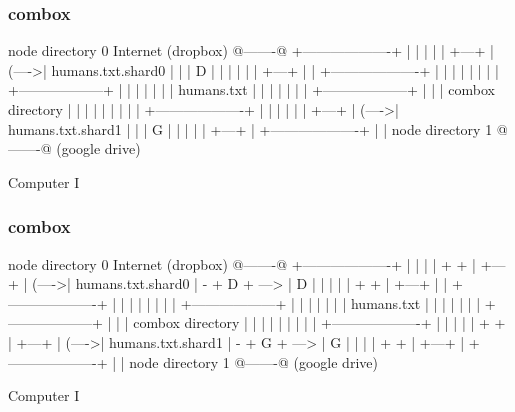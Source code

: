 \begin{frame}[fragile]
  \frametitle{combox}

  {\tiny
  \begin{semiverbatim}

         node directory 0                Internet
         (dropbox)                       @-------@
        +-------------------+            |       |
        |                   |            | +---+ |
  (---->| humans.txt.shard0 |            | | D | |
  |     |                   |            | +---+ |
  |     +-------------------+            |       |
  |                                      |       |
  |                                      |       |
 +------------------+                    |       |
 |                  |                    |       |
 |  humans.txt      |                    |       |
 |                  |                    |       |
 +------------------+                    |       |
  |  combox directory                    |       |
  |                                      |       |
  |                                      |       |
  |     +-------------------+            |       |
  |     |                   |            | +---+ |
  (---->| humans.txt.shard1 |            | | G | |
        |                   |            | +---+ |
        +-------------------+            |       |
         node directory 1                @-------@
         (google drive)

  Computer I
  \end{semiverbatim}
  }

\end{frame}

\begin{frame}[fragile]
  \frametitle{combox}

  {\tiny
  \begin{semiverbatim}

         node directory 0                Internet
         (dropbox)                       @-------@
        +-------------------+            |       |
        |                   |    + +     | +---+ |
  (---->| humans.txt.shard0 | - + D + ---> | D | |
  |     |                   |    + +     | +---+ |
  |     +-------------------+            |       |
  |                                      |       |
  |                                      |       |
 +------------------+                    |       |
 |                  |                    |       |
 |  humans.txt      |                    |       |
 |                  |                    |       |
 +------------------+                    |       |
  |  combox directory                    |       |
  |                                      |       |
  |                                      |       |
  |     +-------------------+            |       |
  |     |                   |    + +     | +---+ |
  (---->| humans.txt.shard1 | - + G + ---> | G | |
        |                   |    + +     | +---+ |
        +-------------------+            |       |
         node directory 1                @-------@
         (google drive)

  Computer I
  \end{semiverbatim}
  }

\end{frame}


